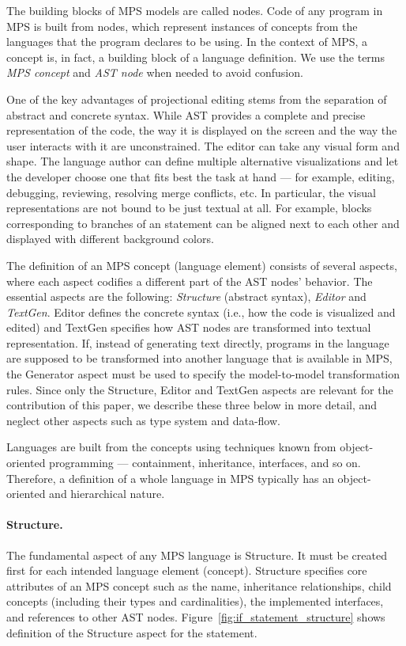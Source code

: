The building blocks of MPS models are called nodes.
Code of any program in MPS is built from nodes, which represent instances of concepts from the languages that the program declares to be using.
 In the context of MPS, a concept is, in fact,  a building block of a language definition.
We use the terms \emph{MPS concept} and \emph{AST node} when needed to avoid confusion.

One of the key advantages of projectional editing stems from the separation of abstract and concrete syntax.
While AST provides a complete and precise representation of the code, the way it is displayed on the screen and the way the user interacts with it are unconstrained.
The editor can take any visual form and shape.
The language author can define multiple alternative visualizations and let the developer choose one that fits best the task at hand --- for example, editing, debugging, reviewing, resolving merge conflicts, etc.
In particular, the visual representations are not bound to be just textual at all.
For example, blocks corresponding to branches of an  statement can be aligned next to each other and displayed with different background colors.

The definition of an MPS concept (language element) consists of several aspects, where each aspect codifies a different part of the AST nodes' behavior.
The essential aspects are the following: \emph{Structure} (abstract syntax), \emph{Editor} and \emph{TextGen}.
Editor defines the concrete syntax (i.e., how the code is visualized and edited) and TextGen specifies how AST nodes are transformed into textual representation.
If, instead of generating text directly, programs in the language are supposed to be transformed into another language that is available in MPS, the Generator aspect must be used to specify the model-to-model transformation rules.
Since only the Structure, Editor and TextGen aspects are relevant for the contribution of this paper, we describe these three below in more detail, and neglect other aspects such as type system and data-flow.

Languages are built from the concepts using techniques known from object-oriented programming --- containment, inheritance, interfaces, and so on.
Therefore, a definition of a whole language in MPS typically has an object-oriented and hierarchical nature.

\paragraph{Structure.}
The fundamental aspect of any MPS language is Structure.
It must be created first for each intended language element (concept).
Structure specifies core attributes of an MPS concept such as the name, inheritance relationships, child concepts (including their types and cardinalities), the implemented interfaces, and references to other AST nodes.
Figure~\ref{fig:if_statement_structure} shows definition of the Structure aspect for the  statement.

